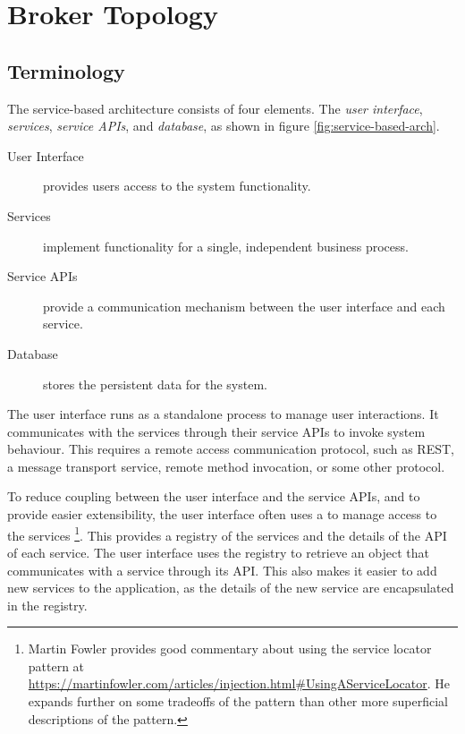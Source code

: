 \section{Broker Topology}

\subsection{Terminology}

The service-based architecture consists of four elements.
The \emph{user interface}, \emph{services}, \emph{service APIs}, and \emph{database}, as shown in figure \ref{fig:service-based-arch}.

\begin{description}
    \item[User Interface] provides users access to the system functionality.
    \item[Services] implement functionality for a single, independent business process.
    \item[Service APIs] provide a communication mechanism between the user interface and each service.
    \item[Database] stores the persistent data for the system.
\end{description}

The user interface runs as a standalone process to manage user interactions.
It communicates with the services through their service APIs to invoke system behaviour.
This requires a remote access communication protocol, such as REST, a message transport service,
remote method invocation,  or some other protocol.

To reduce coupling between the user interface and the service APIs, and to provide easier extensibility, the user interface often uses a
 to manage access to the services%
\footnote{Martin Fowler provides good commentary about using the service locator pattern at \url{https://martinfowler.com/articles/injection.html\#UsingAServiceLocator}.
He expands further on some tradeoffs of the pattern than other more superficial descriptions of the pattern.}.
This provides a registry of the services and the details of the API of each service.
The user interface uses the registry to retrieve an object that communicates with a service through its API.
This also makes it easier to add new services to the application, as the details of the new service are encapsulated in the registry.

